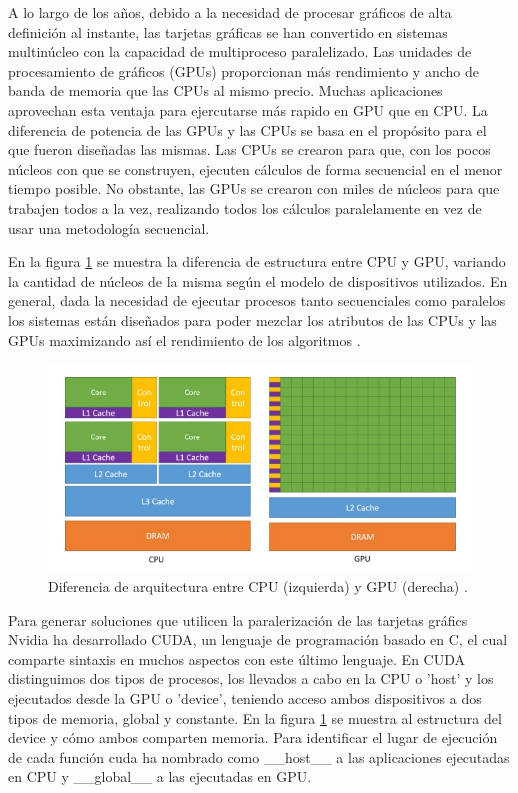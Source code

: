 \documentclass[11pt,a4paper,twoside,pdf]{article}
\numberwithin{equation}{section}
\begin{document}
A lo largo de los años, debido a la necesidad de procesar gráficos de alta definición al instante, las tarjetas gráficas se han convertido en sistemas multinúcleo con la capacidad de multiproceso paralelizado. Las unidades de procesamiento de gráficos (GPUs) proporcionan más rendimiento y ancho de banda de memoria que las CPUs al mismo precio. Muchas aplicaciones aprovechan esta ventaja para ejercutarse más rapido en GPU que en CPU. La diferencia de potencia de las GPUs y las CPUs se basa en el propósito para el que fueron diseñadas las mismas. Las CPUs se crearon para que, con los pocos núcleos con que se construyen, ejecuten cálculos de forma secuencial en el menor tiempo posible. No obstante, las GPUs se crearon con miles de núcleos para que trabajen todos a la vez, realizando todos los cálculos paralelamente en vez de usar una metodología secuencial.

En la figura \ref{fig:arquitectura-cpu-gpu} se muestra la diferencia de estructura entre CPU y GPU, variando la cantidad de núcleos de la misma según el modelo de dispositivos utilizados. En general, dada la necesidad de ejecutar procesos tanto secuenciales como paralelos los sistemas están diseñados para poder mezclar los atributos de las CPUs y las GPUs maximizando así el rendimiento de los algoritmos \cite{web}.

\begin{figure}[h]
\centering
\includegraphics[width=15cm]{Nvidia-CPU-GPU.jpg}				
\caption{Diferencia de arquitectura entre CPU (izquierda) y GPU (derecha) \cite{web}. }
\label{fig:arquitectura-cpu-gpu}
\end{figure}
\noindent

Para generar soluciones que utilicen la paralerización de las tarjetas gráfics Nvidia ha desarrollado CUDA, un lenguaje de programación basado en C, el cual comparte sintaxis en muchos aspectos con este último lenguaje. En CUDA distinguimos dos tipos de procesos, los llevados a cabo en la CPU o 'host' y los ejecutados desde la GPU o 'device', teniendo acceso ambos dispositivos a dos tipos de memoria, global y constante. En la figura \ref{fig:arquitectura-cpu-gpu} se muestra al estructura del device y cómo ambos comparten memoria. Para identificar el lugar de ejecución de cada función cuda ha nombrado como \_\_host\_\_ a las aplicaciones ejecutadas en CPU y \_\_global\_\_ a las ejecutadas en GPU.
\end{document}
